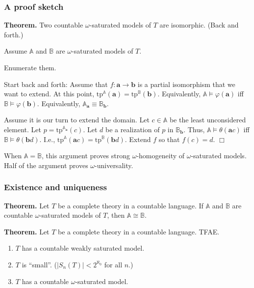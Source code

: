 \documentclass[t,xcolor=dvipsnames,handout]{beamer}
\theoremstyle{theoremFermat}
\theoremstyle{reimann}
\theoremstyle{ACExample}
\def\wec#1{{\mathbf #1}}
\begin{document}
\begin{frame} 
  \frametitle{A proof sketch}

\pause
\noindent
    {\bf Theorem.}
    Two countable $\omega$-saturated models of $T$ are isomorphic. \pause
(Back and forth.) \pause

\bigskip

Assume $\mathbb A$ and $\mathbb B$ are $\omega$-saturated models of $T$. \pause

\medskip

Enumerate them. \pause

\medskip

Start back and forth: \pause Assume that $f: \wec{a}\to \wec{b}$
is a partial isomorphism that we want to extend. \pause
At this point,
$\textrm{tp}^{\mathbb A}(\wec{a})=\textrm{tp}^{\mathbb B}(\wec{b})$. \pause
Equivalently, $\mathbb A\models \varphi(\wec{a})$
iff $\mathbb B\models \varphi(\wec{b})$. \pause
Equivalently, $\mathbb A_{\wec{a}}\equiv \mathbb B_{\wec{b}}$. \pause

\medskip

Assume it is our turn to extend the domain. \pause
Let $c\in \mathbb A$ be the least unconsidered element. \pause
Let $p=\textrm{tp}^{\mathbb A_{\wec{a}}}(c)$. \pause
Let $d$ be a realization of $p$ in $\mathbb B_{\wec{b}}$. \pause
Thus, $\mathbb A\models \theta(\wec{a}c)$
iff $\mathbb B\models \theta(\wec{b}d)$. \pause
I.e.,  $\textrm{tp}^{\mathbb A}(\wec{a}c)=\textrm{tp}^{\mathbb B}(\wec{b}d)$. \pause
Extend $f$ so that $f(c)=d$. \pause $\Box$ \pause
\bigskip

When $\mathbb A=\mathbb B$, this argument proves strong $\omega$-homogeneity
of $\omega$-saturated models. \pause
Half of the argument proves $\omega$-universality.
\end{frame}


\begin{frame} 
  \frametitle{Existence and uniqueness}

\bigskip
\pause

\noindent
    {\bf Theorem.} Let $T$ be a complete theory in a countable language.
    If $\mathbb A$ and $\mathbb B$ are countable $\omega$-saturated models
    of $T$, then $\mathbb A\cong \mathbb B$.     

\pause
\noindent
    {\bf Theorem.} Let $T$ be a complete theory in a countable language.
TFAE. \pause
\begin{enumerate}
\item $T$ has a countable weakly saturated model.
\item $T$ is ``small''. ($|S_n(T)|<2^{\aleph_0}$ for all $n$.)
\item $T$ has a countable $\omega$-saturated model.
\end{enumerate}
\end{frame}
\end{document}
